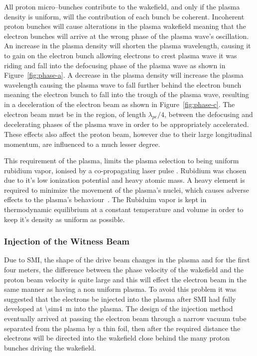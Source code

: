 All proton micro--bunches contribute to the wakefield, and only if the plasma
density is uniform, will the contribution of each bunch be coherent. Incoherent
proton bunches will cause alterations in the plasma wakefield meaning that the
electron bunches will arrive at the wrong phase of the plasma wave's
oscillation. An increase in the plasma density will shorten the plasma
wavelength, causing it to gain on the electron bunch allowing electrons to crest
plasma wave it was riding and fall into the defocusing phase of the plasma wave
as shown in Figure~\ref{fig:phase-a}. A decrease in the plasma density will
increase the plasma wavelength causing the plasma wave to fall further behind
the electron bunch meaning the electron bunch to fall into the trough of the
plasma wave, resulting in a deceleration of the electron beam as shown in
Figure~\ref{fig:phase-c}.  The electron beam must be in the region, of length
\(\lambda_{pe}/4\), between the defocusing and decelerating phases of the plasma
wave in order to be appropriately accelerated. These effects also affect the
proton beam, however due to their large longitudinal momentum, are influenced to
a much lesser degree.

This requirement of the plasma, limits the plasma selection to being uniform
rubidium vapor, ionised by a co-propagating laser pulse \cite{oz2014novel,
oz2014bja}. Rubidium was chosen due to it's low ionization potential and heavy
atomic mass. A heavy element is required to minimize the movement of the
plasma's nuclei, which causes adverse effects to the plasma's
behaviour~\cite{vieira2012nj,vieira2014bqa}. The Rubiduim vapor is kept in
thermodynamic equilibrium at a constant temperature and volume in order to keep
it's density as uniform as possible.


\subsubsection{Injection of the Witness Beam}

Due to SMI, the shape of the drive beam changes in the plasma and for the first
four meters, the difference between the phase velocity of the wakefield and the
proton beam velocity is quite large and this will effect the electron beam in
the same manner as having a non uniform plasma. To avoid this
problem it was suggested that the electrons be injected into the plasma
after SMI had fully developed at \SI{\sim4}{\meter} into the plasma.
The design of the injection method eventually arrived at
passing the electron beam through a narrow vacuum tube separated from the
plasma by a thin foil, then after the required distance the electrons will be
directed into the wakefield close behind the many proton bunches driving the
wakefield.

